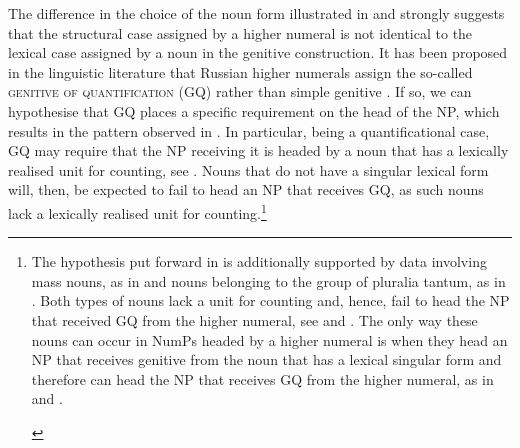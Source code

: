 \documentclass[output=paper,
modfonts,
newtxmath,
hidelinks
]{langscibook}
\begin{document}
\noindent The difference in the choice of the noun form illustrated in  and  strongly suggests that the structural case assigned by a higher numeral is not identical to the lexical case assigned by a noun in the genitive construction. It has been proposed in the linguistic literature that Russian higher numerals assign the so-called \textsc{genitive of quantification} (GQ) rather than simple genitive \citep{Bošković2006}. If so, we can hypothesise that GQ places a specific requirement on the head of the NP, which results in the pattern observed in . In particular, being a quantificational case, GQ may require that the NP receiving it is headed by a noun that has a lexically realised unit for counting, see . Nouns that do not have a singular lexical form will, then, be expected to fail to head an NP that receives GQ, as such nouns lack a lexically realised unit for counting.\footnote{\label{18:fn4}The hypothesis put forward in  is additionally supported by data involving mass nouns, as in  and nouns belonging to the group of pluralia tantum, as in . Both types of nouns lack a unit for counting and, hence, fail to head the NP that received GQ from the higher numeral, see  and . The only way these nouns can occur in NumPs headed by a higher numeral is when they head an NP that receives genitive from the noun that has a lexical singular form and therefore can head the NP that receives GQ from the higher numeral, as in  and .

\begin{multicols}{2}
\ea \label{18:fn4i}
	\label{18:fn4ia}
    \label{18:fn4ib}
    \z
\z

\columnbreak

\ea \label{18:fn4ii}
	\label{18:fn4iia}
    \label{18:fn4iib}
    \z
\z


\end{multicols}}
\end{document}
